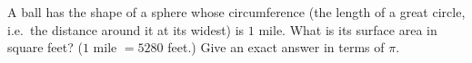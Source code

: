 A ball has the shape of a sphere whose circumference (the length of a great circle, i.e.\ the distance around it at its widest) is $1$ mile. What is its surface area in square feet? ($1$ mile $=5280$ feet.) Give an exact answer in terms of $\pi$.
